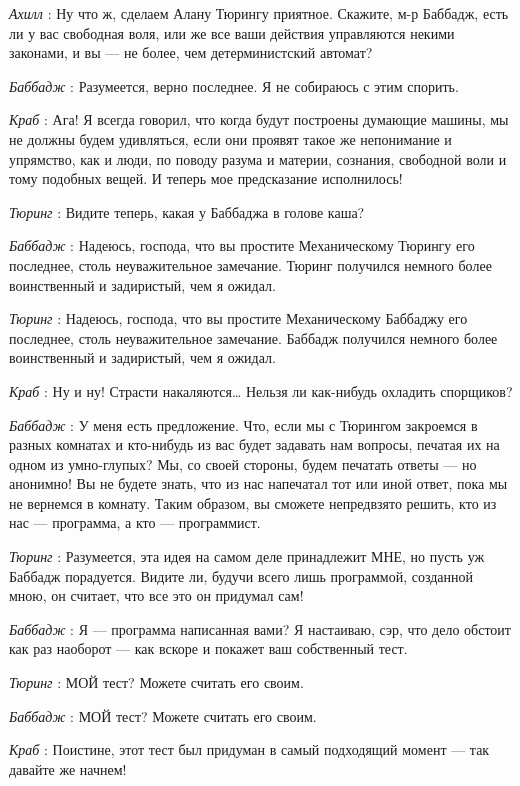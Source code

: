 \documentclass[../main.tex]{subfiles}
\begin{document}
\begin{dialogue}
\emph{Ахилл} : Ну что ж, сделаем Алану Тюрингу приятное. Скажите, м-р Баббадж, есть ли у вас свободная воля, или же все ваши действия управляются некими законами, и вы --- не более, чем детерминистский автомат?

\emph{Баббадж} : Разумеется, верно последнее. Я не собираюсь с этим спорить.

\emph{Краб} : Ага! Я всегда говорил, что когда будут построены думающие машины, мы не должны будем удивляться, если они проявят такое же непонимание и упрямство, как и люди, по поводу разума и материи, сознания, свободной воли и тому подобных вещей. И теперь мое предсказание исполнилось!

\emph{Тюринг} : Видите теперь, какая у Баббаджа в голове каша?

\emph{Баббадж} : Надеюсь, господа, что вы простите Механическому Тюрингу его последнее, столь неуважительное замечание. Тюринг получился немного более воинственный и задиристый, чем я ожидал.

\emph{Тюринг} : Надеюсь, господа, что вы простите Механическому Баббаджу его последнее, столь неуважительное замечание. Баббадж получился немного более воинственный и задиристый, чем я ожидал.

\emph{Краб} : Ну и ну! Страсти накаляются\ldots{} Нельзя ли как-нибудь охладить спорщиков?

\emph{Баббадж} : У меня есть предложение. Что, если мы с Тюрингом закроемся в разных комнатах и кто-нибудь из вас будет задавать нам вопросы, печатая их на одном из умно-глупых? Мы, со своей стороны, будем печатать ответы --- но анонимно! Вы не будете знать, что из нас напечатал тот или иной ответ, пока мы не вернемся в комнату. Таким образом, вы сможете непредвзято решить, кто из нас --- программа, а кто --- программист.

\emph{Тюринг} : Разумеется, эта идея на самом деле принадлежит МНЕ, но пусть уж Баббадж порадуется. Видите ли, будучи всего лишь программой, созданной мною, он считает, что все это он придумал сам!

\emph{Баббадж} : Я --- программа написанная вами? Я настаиваю, сэр, что дело обстоит как раз наоборот --- как вскоре и покажет ваш собственный тест.

\emph{Тюринг} : МОЙ тест? Можете считать его своим.

\emph{Баббадж} : МОЙ тест? Можете считать его своим.

\emph{Краб} : Поистине, этот тест был придуман в самый подходящий момент --- так давайте же начнем!


\end{dialogue}
\end{document}
